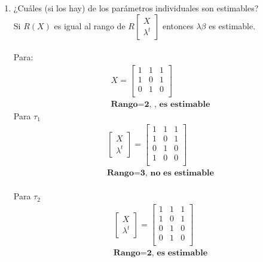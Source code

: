\documentclass[10pt,a4paper]{report}
\begin{document}
\begin{enumerate}
\begin{enumerate}
\item ¿Cuáles (si los hay) de los parámetros individuales son estimables?\\


Si $R(X)$ es igual al rango de $R\begin{bmatrix} X\\ \lambda^t\end{bmatrix}$ entonces $\lambda\beta$ es estimable.\\ \\

Para: \\
\begin{align*}
    &X=\begin{bmatrix}
        1 &1 &1\\
        1 &0 &1\\
        0 &1 &0\\
    \end{bmatrix}\\
    &\textbf{Rango=2, , es estimable}
\end{align*}
Para $\tau_1$
\begin{align*}
&\begin{bmatrix} X\\ \lambda^t\end{bmatrix} =
\begin{bmatrix}
        1 &1 &1\\
        1 &0 &1\\
        0 &1 &0\\
        1 &0 &0\\
    \end{bmatrix}\\ &\textbf{Rango=3, no es estimable}
\end{align*}\\

Para $\tau_2$
\begin{align*}
&\begin{bmatrix} X\\ \lambda^t\end{bmatrix} =
\begin{bmatrix}
        1 &1 &1\\
        1 &0 &1\\
        0 &1 &0\\
        0 &1 &0\\
    \end{bmatrix}\\ &\textbf{Rango=2, es estimable}
\end{align*}


\end{enumerate}
\end{enumerate}
\end{document}
